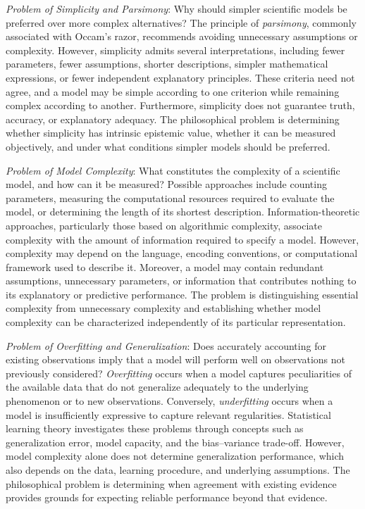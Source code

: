 \emph{Problem of Simplicity and Parsimony}: Why should simpler scientific models be preferred over more complex alternatives? The principle of \emph{parsimony}, commonly associated with Occam's razor, recommends avoiding unnecessary assumptions or complexity. However, simplicity admits several interpretations, including fewer parameters, fewer assumptions, shorter descriptions, simpler mathematical expressions, or fewer independent explanatory principles. These criteria need not agree, and a model may be simple according to one criterion while remaining complex according to another. Furthermore, simplicity does not guarantee truth, accuracy, or explanatory adequacy. The philosophical problem is determining whether simplicity has intrinsic epistemic value, whether it can be measured objectively, and under what conditions simpler models should be preferred.

\emph{Problem of Model Complexity}: What constitutes the complexity of a scientific model, and how can it be measured? Possible approaches include counting parameters, measuring the computational resources required to evaluate the model, or determining the length of its shortest description. Information-theoretic approaches, particularly those based on algorithmic complexity, associate complexity with the amount of information required to specify a model. However, complexity may depend on the language, encoding conventions, or computational framework used to describe it. Moreover, a model may contain redundant assumptions, unnecessary parameters, or information that contributes nothing to its explanatory or predictive performance. The problem is distinguishing essential complexity from unnecessary complexity and establishing whether model complexity can be characterized independently of its particular representation.

\emph{Problem of Overfitting and Generalization}: Does accurately accounting for existing observations imply that a model will perform well on observations not previously considered? \emph{Overfitting} occurs when a model captures peculiarities of the available data that do not generalize adequately to the underlying phenomenon or to new observations. Conversely, \emph{underfitting} occurs when a model is insufficiently expressive to capture relevant regularities. Statistical learning theory investigates these problems through concepts such as generalization error, model capacity, and the bias--variance trade-off. However, model complexity alone does not determine generalization performance, which also depends on the data, learning procedure, and underlying assumptions. The philosophical problem is determining when agreement with existing evidence provides grounds for expecting reliable performance beyond that evidence.


